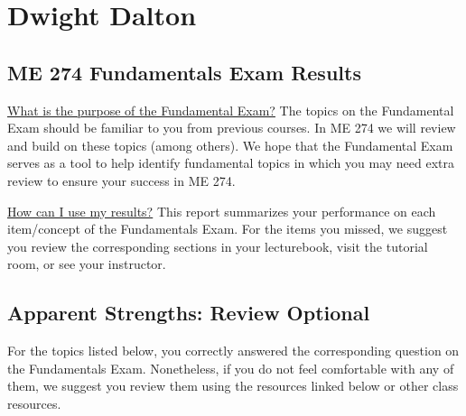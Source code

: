 \documentclass[11pt,letterpaper]{article}\usepackage[]{graphicx}\usepackage[]{color}
\begin{document}

\section*{Dwight Dalton}
\subsection*{ME 274 Fundamentals Exam Results}
\underline{What is the purpose of the Fundamental Exam?}  The topics on the Fundamental Exam should be familiar to you from previous courses.  In ME 274 we will review and build on these topics (among others). We hope that the Fundamental Exam serves as a tool to help identify fundamental topics in which you may need extra review to ensure your success in ME 274.\

\underline{How can I use my results?}  This report summarizes your performance on each item/concept of the Fundamentals Exam.  For the items you missed, we suggest you review the corresponding sections in your lecturebook, visit the tutorial room, or see your instructor.

\subsection*{Apparent Strengths: Review Optional}
For the topics listed below, you correctly answered the corresponding question on the Fundamentals Exam.  Nonetheless, if you do not feel comfortable with any of them, we suggest you review them using the resources linked below or other class resources.
\end{document}
